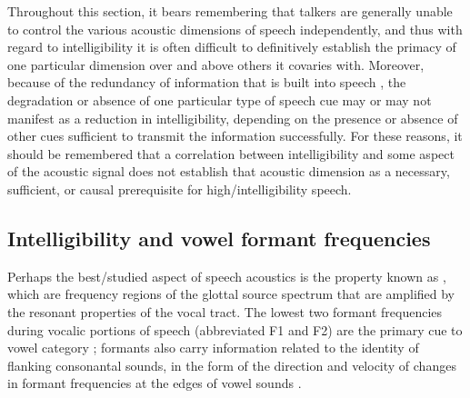 Throughout this section, it bears remembering that talkers are generally unable to control the various acoustic dimensions of speech independently, and thus with regard to intelligibility it is often difficult to definitively establish the primacy of one particular dimension over and above others it covaries with.\footnotemark{}  Moreover, because of the redundancy of information that is built into speech \citep{AylettTurk2004, AylettTurk2006}, the degradation or absence of one particular type of speech cue may or may not manifest as a reduction in intelligibility, depending on the presence or absence of other cues sufficient to transmit the information successfully.  For these reasons, it should be remembered that a correlation between intelligibility and some aspect of the acoustic signal does not establish that acoustic dimension as a necessary, sufficient, or causal prerequisite for high\-/intelligibility speech.     

\subsection{Intelligibility and vowel formant frequencies\label{sec:IntelVowel}}
Perhaps the best\-/studied aspect of speech acoustics is the property known as , which are frequency regions of the glottal source spectrum that are amplified by the resonant properties of the vocal tract.  The lowest two formant frequencies during vocalic portions of speech (abbreviated F1 and F2) are the primary cue to vowel category \citep{SyrdalGopal1986}; formants also carry information related to the identity of flanking consonantal sounds, in the form of the direction and velocity of changes in formant frequencies at the edges of vowel sounds \citep{DelattreEtAl1955}.

